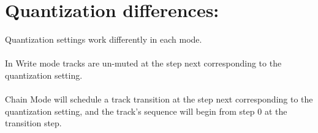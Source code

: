 \section{Quantization differences:}
Quantization settings work differently in each mode.\\
\\
 In Write mode tracks are un-muted at the step next corresponding to the quantization setting. \\
\\
Chain Mode will schedule a track transition at the step next corresponding to the quantization setting, and the track's sequence will begin from step 0 at the transition step.
 
